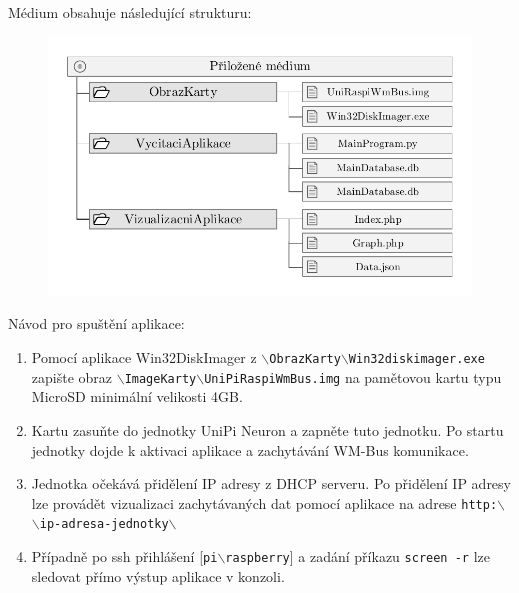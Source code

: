 \vspace{10pt}
Médium obsahuje následující strukturu: 
\vspace{-20pt}
	 \begin{figure}[!h]
  \begin{center}
    \includegraphics[scale=0.8]{obrazky/priloha_medium}
  \end{center}
	\vspace{-30pt}
\end{figure}

Návod pro spuštění aplikace:
		\begin{enumerate}
			\item Pomocí aplikace Win32DiskImager z \texttt{$\backslash$ObrazKarty$\backslash$Win32diskimager.exe} zapište obraz \texttt{$\backslash$ImageKarty$\backslash$UniPiRaspiWmBus.img} na pamětovou kartu typu MicroSD minimální velikosti 4GB.
			\item Kartu zasuňte do jednotky UniPi Neuron a zapněte tuto jednotku. Po startu jednotky dojde k aktivaci aplikace a zachytávání WM-Bus komunikace.
			\item Jednotka očekává přidělení IP adresy z DHCP serveru. Po přidělení IP adresy lze provádět vizualizaci zachytávaných dat pomocí aplikace na adrese \texttt{http:$\backslash$$\backslash$ip-adresa-jednotky$\backslash$}
			\item Případně po ssh přihlášení [\texttt{pi$\backslash$raspberry}] a zadání příkazu \texttt{screen -r} lze sledovat přímo výstup aplikace v konzoli.
		\end{enumerate}

